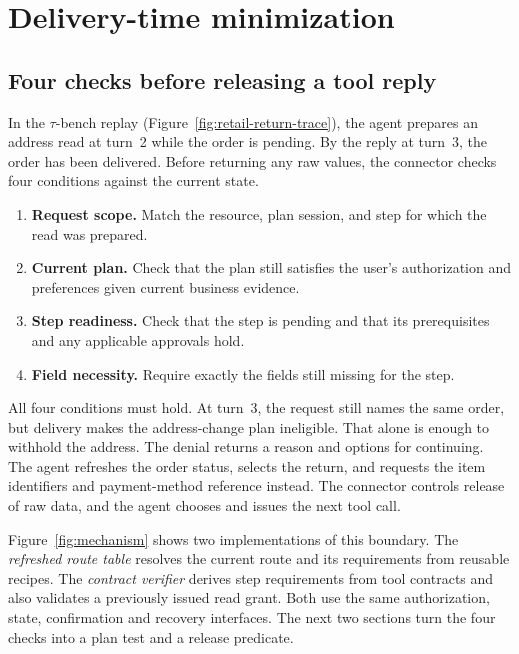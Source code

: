 \section{Delivery-time minimization}
\label{sec:method}

\subsection{Four checks before releasing a tool reply}
\label{sec:four-checks}
In the $\tau$-bench replay (Figure~\ref{fig:retail-return-trace}), the agent prepares an address read at turn~2 while the order is pending. By the reply at turn~3, the order has been delivered. Before returning any raw values, the connector checks four conditions against the current state.

\begin{enumerate}
\setlength{\itemsep}{1pt}
\item \textbf{Request scope.} Match the resource, plan session, and step for which the read was prepared.
\item \textbf{Current plan.} Check that the plan still satisfies the user's authorization and preferences given current business evidence.
\item \textbf{Step readiness.} Check that the step is pending and that its prerequisites and any applicable approvals hold.
\item \textbf{Field necessity.} Require exactly the fields still missing for the step.
\end{enumerate}

All four conditions must hold. At turn~3, the request still names the same order, but delivery makes the address-change plan ineligible. That alone is enough to withhold the address. The denial returns a reason and options for continuing. The agent refreshes the order status, selects the return, and requests the item identifiers and payment-method reference instead. The connector controls release of raw data, and the agent chooses and issues the next tool call.

Figure~\ref{fig:mechanism} shows two implementations of this boundary. The \emph{refreshed route table} resolves the current route and its requirements from reusable recipes. The \emph{contract verifier} derives step requirements from tool contracts and also validates a previously issued read grant. Both use the same authorization, state, confirmation and recovery interfaces. The next two sections turn the four checks into a plan test and a release predicate.

